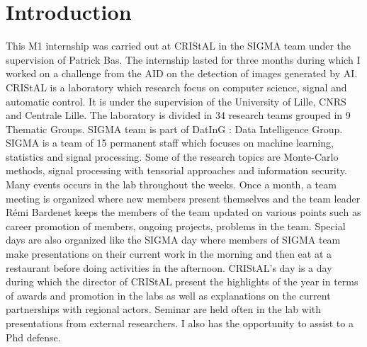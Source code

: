 \documentclass[12pt,a4paper]{article}
\begin{document}
\section*{Introduction}
This M1 internship was carried out at CRIStAL in the SIGMA team under the supervision of Patrick Bas. The internship lasted for three months during which I worked on a challenge from the AID on the detection of images generated by AI.\\
CRIStAL is a laboratory which research focus on computer science, signal and automatic control. It is under the supervision of the University of Lille, CNRS and Centrale Lille. The laboratory is divided in 34 research teams grouped in 9 Thematic Groups. SIGMA team is part of DatInG : Data Intelligence Group. SIGMA is a team of 15 permanent staff which focuses on machine learning, statistics and signal processing. Some of the research topics are Monte-Carlo methods, signal processing with tensorial approaches and information security.
Many events occurs in the lab throughout the weeks. Once a month, a team meeting is organized where new members present themselves and the team leader Rémi Bardenet keeps the members of the team updated on various points such as career promotion of members, ongoing projects, problems in the team. Special days are also organized like the SIGMA day where members of SIGMA team make presentations on their current work in the morning and then eat at a restaurant before doing activities in the afternoon. CRIStAL's day is a day during which the director of CRIStAL present the highlights of the year in terms of awards and promotion in the labs as well as explanations on the current partnerships with regional actors. Seminar are held often in the lab with presentations from external researchers. I also has the opportunity to assist to a Phd defense.
\end{document}
